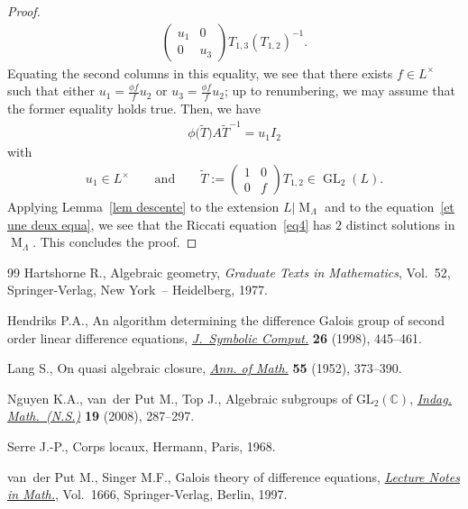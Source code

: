 \documentclass[11pt]{article}
\numberwithin{equation}{section}
\begin{document}
\begin{proof}
\begin{gather*}
\begin{pmatrix}
u_{1}&0
\\
0&u_{3}
\end{pmatrix}
T_{1,3} (T_{1,2} )^{-1}.
\end{gather*}
Equating the second columns in this equality, we see that there exists $f \in L^{\times}$ such that either
$u_{1}=\frac{\phi f}{f} u_{2}$ or $u_{3}=\frac{\phi f}{f} u_{2}$; up to renumbering, we may assume that the former
equality holds true.
Then, we have
\begin{gather}
\label{et une deux equa}
\phi\big(\widetilde{T}\big)A\widetilde{T}^{-1}= u_{1} I_{2}
\end{gather}
with
\begin{gather*}
u_{1} \in L^{\times} \qquad \text{and} \qquad \widetilde{T}:=
\begin{pmatrix}
1&0
\\
0&f
\end{pmatrix}
T_{1,2}\in \operatorname{GL}_{2}(L).
\end{gather*}
Applying Lemma~\ref{lem descente} to the extension $L \vert \operatorname{M}_{\Lambda}$ and to the equation~\eqref{et
une deux equa}, we see that the Riccati equation~\eqref{eq4} has $2$ distinct solutions in $\operatorname{M}_{\Lambda}$.
This concludes the proof.
\end{proof}
\begin{thebibliography}{99}
Hartshorne R., Algebraic geometry, \textit{Graduate Texts in Mathematics}, Vol.~52, Springer-Verlag, New York~--
Heidelberg, 1977.

Hendriks P.A., An algorithm determining the dif\/ference {G}alois group of second order linear dif\/ference equations,
\href{http://dx.doi.org/10.1006/jsco.1998.0223}{\textit{J.~Symbolic Comput.}} \textbf{26} (1998), 445--461.

Lang S., On quasi algebraic closure, \href{http://dx.doi.org/10.2307/1969785}{\textit{Ann. of Math.}} \textbf{55} (1952), 373--390.

Nguyen K.A., van~der Put M., Top J., Algebraic subgroups of {${\text{GL}}_2({\mathbb{C}})$},
\href{http://dx.doi.org/10.1016/S0019-3577(08)80004-3}{\textit{Indag. Math.~(N.S.)}} \textbf{19} (2008), 287--297.

Serre J.-P., Corps locaux, Hermann, Paris, 1968.

van~der Put M., Singer M.F., Galois theory of dif\/ference equations,
\href{http://dx.doi.org/10.1007/BFb0096118}{\textit{Lecture Notes in Math.}}, Vol.~1666, Springer-Verlag, Berlin, 1997.

\end{thebibliography}
\end{document}
